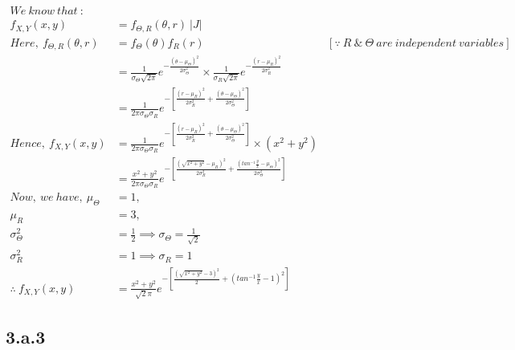 \documentclass[a4paper,fleqn,11pt]{article}
\theoremstyle{mytheor}
\begin{document}
\begin{align*}				   
We\ know\ that\ : \\
f_{X,Y} (x, y) & = f_{\Theta,R} (\theta, r)\ |J| \\
Here,\ f_{\Theta,R} (\theta, r) & = f_{\Theta} (\theta) f_{R} (r)\ &
[\because\ R\ \&\ \Theta\ are\ independent\ variables] \\
& = \frac{1}{\sigma_\Theta \sqrt{2\pi}} e^{-\frac{(\theta - \mu_\Theta)^2}{2\sigma_\Theta^2}} \times
\frac{1}{\sigma_R \sqrt{2\pi}} e^{-\frac{(r - \mu_R)^2}{2\sigma_R^2}}  \\
& = \frac{1}{ 2\pi\sigma_\Theta \sigma_R}
e^{-[\frac{(r - \mu_R)^2}{2\sigma_R^2} + \frac{(\theta - \mu_\Theta)^2}{2\sigma_\Theta^2}]} \\
Hence,\ f_{X,Y} (x, y) & = \frac{1}{ 2\pi\sigma_\Theta \sigma_R}
e^{-[\frac{(r - \mu_R)^2}{2\sigma_R^2} + \frac{(\theta - \mu_\Theta)^2}{2\sigma_\Theta^2}]} \times (x^2 + y^2) \\
& = \frac{x^2 + y^2}{ 2\pi\sigma_\Theta \sigma_R}
e^{-[\frac{(\sqrt{x^2 + y^2} - \mu_R)^2}{2\sigma_R^2} + \frac{(tan^{-1} \frac{y}{x} - \mu_\Theta)^2}{2\sigma_\Theta^2}]} \\
Now,\ we\ have,\ \mu_\Theta & = 1, \\
				  \mu_R & = 3, \\
				  \sigma_\Theta^2 & = \frac{1}{2}
				  \implies \sigma_\Theta = \frac{1}{\sqrt{2}} \\
				  \sigma_R^2 & = 1 \implies \sigma_R = 1 \\
\therefore\ f_{X,Y} (x, y) & = \frac{x^2 + y^2}{\sqrt{2}\pi} e^{-[\frac{(\sqrt{x^2 + y^2} - 3)^2}{2} + (tan^{-1} \frac{y}{x} - 1)^2]}
\end{align*}

\subsection*{3.a.3}
\end{document}
